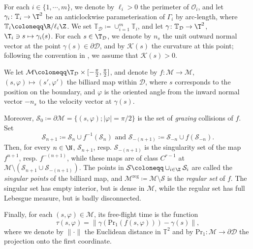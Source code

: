 \documentclass[reqno,11pt]{amsart}
\begin{document}
\par For each \( i \in \{1,\cdots,m\} \), we denote by \( \ell_i>0 \) the perimeter of \( \mathcal{O}_i \), and let \( \gamma_i\colon \mathbb{T}_i\to \T^2 \) be an anticlockwise parameterisation of \( \Gamma_i \) by arc-length, where \( \mathbb{T}_i\coloneqq\R/\ell_i \Z \).
We set \( \mathbb{T}_\mathcal{D}\coloneqq\cup_{i=1}^m \mathbb{T}_i \), and let \( \gamma\colon \mathbb{T}_\mathcal{D}\to  \T^2 \), \( \T_i \ni s\mapsto \gamma_i(s) \). 
For each \( s \in \T_\mathcal{D} \), we denote by \( n_s \) the unit outward normal vector at the point \( \gamma(s)\in \partial \mathcal{D} \), and by \( \mathcal{K}(s) \) the curvature at this point; following the convention in \cite{chernov_chaotic_2006}, we assume that \( \mathcal{K}(s)> 0 \). 
\par We let \( \mathcal{M}\coloneqq\T_\mathcal{D} \times [-\frac{\pi}{2},\frac{\pi}{2}] \), and denote by \( f\colon\mathcal{M} \to\mathcal{M} \), \( (s,\varphi)\mapsto (s',\varphi') \) the billiard map within \( \mathcal{D} \), where \( s \) corresponds to the position on the boundary, and \( \varphi \) is the oriented angle from the inward normal vector \( -n_s \) to the velocity vector at \( \gamma(s) \).
\par Moreover, \( \mathcal{S}_0 \coloneqq \partial \mathcal{M} = \{(s,\varphi); |\varphi| = \pi/2\} \) is the set of \emph{grazing} collisions of \( f \). 
Set
\[
    \mathcal{S}_{n+1} \coloneqq \mathcal{S}_n \cup f^{-1}(\mathcal{S}_n) \text{ and }  \mathcal{S}_{-(n+1)} \coloneqq \mathcal{S}_{-n} \cup f(\mathcal{S}_{-n}).
\] 
Then, for every \( n \in \N \), \( \mathcal{S}_{n+1}\), resp. \( \mathcal{S}_{-(n+1)}\) is the singularity set of the map \( f^{n+1} \), resp. \( f^{-(n+1)} \), while these maps are  of class \( C^{r-1} \) at \( \mathcal{M}\setminus(\mathcal{S}_{n+1} \cup \mathcal{S}_{-(n+1)}) \).
The points in \( \mathcal{S} \coloneqq \cup_{i \in \Z} \mathcal{S}_i \) are called the \emph{singular points} of the billiard map, and \( \mathcal{M}^\mathrm{reg} \coloneqq \mathcal{M}\setminus\mathcal{S} \) is the \emph{regular set} of \( f \).
The singular set has empty interior, but is dense in \(\mathcal{M}\), while the regular set has full Lebesgue measure, but is badly disconnected. 
\par Finally, for each \( (s, \varphi) \in \mathcal{M} \), its free-flight time is the function 
\[
    \tau(s, \varphi) = \|\gamma(\mathrm{Pr}_1(f(s, \varphi))) - \gamma(s)\|,
\]
where we denote by \( \| \cdot \| \) the Euclidean distance in \( \mathbb{T}^2 \) and by \(\mathrm{Pr}_1\colon \mathcal{M} \to \partial\mathcal{D}\) the projection onto the first coordinate.
\end{document}
